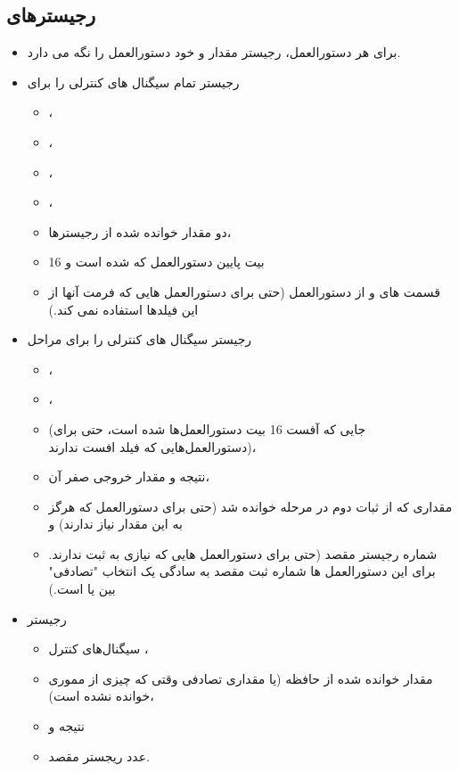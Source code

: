 \documentclass[11pt, dvipsnames, svgnames, x11names]{article}
\begin{document}
\subsection{رجیستر‌های }
\begin{itemize}
\item 
برای هر دستورالعمل، رجیستر
مقدار
و خود دستورالعمل را نگه می دارد.

\item 
رجیستر
تمام سیگنال های کنترلی را برای
\begin{itemize}
\item {}،
\item {}،
\item {}،
\item {}،
\item دو مقدار خوانده شده از رجیستر‌ها،
\item 
16 بیت پایین دستورالعمل که 
شده است و
\item 
قسمت های
و
از دستورالعمل (حتی برای دستورالعمل هایی که فرمت آنها از این فیلدها استفاده نمی کند.)
\end{itemize}

\item 
رجیستر 
سیگنال های کنترلی را برای مراحل
\begin{itemize}
\item {}،
\item {}، 
\item 
{}
(جایی که آفست 16 بیت دستورالعمل‌ها 
شده است، حتی برای دستورالعمل‌هایی که فیلد افست ندارند)،
\item 
نتیجه  و مقدار خروجی صفر آن،
\item 
مقداری که از ثبات دوم در مرحله 
خوانده شد (حتی برای دستورالعمل که هرگز به این مقدار نیاز ندارند) و
\item 
شماره رجیستر مقصد (حتی برای دستورالعمل هایی که نیازی به ثبت ندارند. برای این دستورالعمل ها شماره ثبت مقصد به سادگی یک انتخاب "تصادفی" بین
یا
است.)
\end{itemize} 

\item 
رجیستر 
\begin{itemize}
\item 
سیگنال‌های کنترل ،
\item 
مقدار خوانده شده از حافظه (یا مقداری تصادفی وقتی که چیزی از مموری خوانده نشده است)،
\item 
نتیجه  و
\item 
عدد ریجستر مقصد.
\end{itemize}
\end{itemize}
\end{document}
